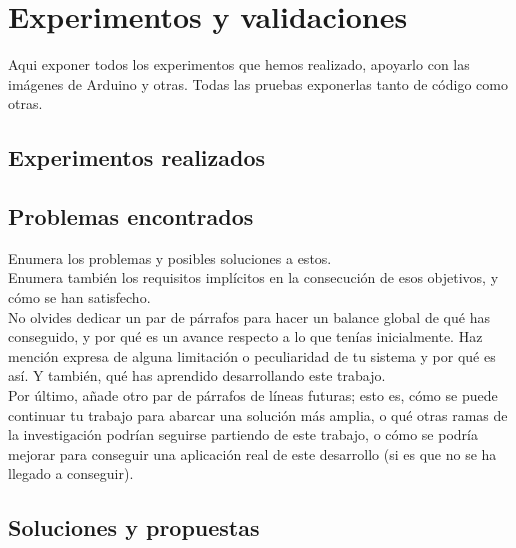 \chapter{Experimentos y validaciones}
\label{cap:capitulo5}

Aqui exponer todos los experimentos que hemos realizado, apoyarlo con las imágenes de Arduino y otras. Todas las pruebas exponerlas tanto de código como otras.
\vspace{0.45cm}

\section{Experimentos realizados}

\section{Problemas encontrados}

Enumera los problemas y posibles soluciones a estos.\\

Enumera también los requisitos implícitos en la consecución de esos objetivos, y cómo se han satisfecho.\\

No olvides dedicar un par de párrafos para hacer un balance global de qué has conseguido, y por qué es un avance respecto a lo que tenías inicialmente. Haz mención expresa de alguna limitación o peculiaridad de tu sistema y por qué es así. Y también, qué has aprendido desarrollando este trabajo.\\

Por último, añade otro par de párrafos de líneas futuras; esto es, cómo se puede continuar tu trabajo para abarcar una solución más amplia, o qué otras ramas de la investigación podrían seguirse partiendo de este trabajo, o cómo se podría mejorar para conseguir una aplicación real de este desarrollo (si es que no se ha llegado a conseguir).

\section{Soluciones y propuestas}
